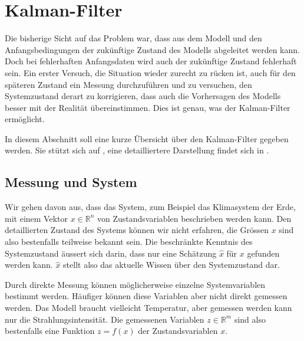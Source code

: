 %
%
%
\section{Kalman-Filter\label{section:kalman-filter}}
%
Die bisherige Sicht auf das Problem war, dass aus dem Modell und den
Anfangsbedingungen der zukünftige Zustand des Modells abgeleitet werden
kann.
Doch bei fehlerhaften Anfangsdaten wird auch der zukünftige Zustand
fehlerhaft sein.
Ein erster Versuch, die Situation wieder zurecht zu rücken ist, auch für
den späteren Zustand ein Messung durchzuführen und zu versuchen,
den Systemzustand derart zu korrigieren, dass auch die Vorhersagen des
Modells besser mit der Realität übereinstimmen.
Dies ist genau, was der Kalman-Filter ermöglicht.

In diesem Abschnitt soll eine kurze Übersicht über den Kalman-Filter
gegeben werden.
Sie stützt sich auf \cite{skript:catlin}, eine detailliertere Darstellung
findet sich in \cite[Kapitel 8]{skript:wrstatskript}.

\subsection{Messung und System\label{subsection:messung und system}}
Wir gehen davon aus, dass das System, zum Beispiel das Klimasystem der Erde,
mit einem Vektor $x\in\mathbb R^n$ von Zustandsvariablen beschrieben werden
kann.
Den detaillierten Zustand des Systems können wir nicht erfahren, die
Grössen $x$ sind also bestenfalls teilweise bekannt sein.
Die beschränkte Kenntnis des Systemzustand äussert sich darin, dass
nur eine Schätzung $\hat x$ für $x$ gefunden werden kann.
$\hat x$ stellt also das aktuelle Wissen über den Systemzustand dar.

Durch direkte Messung können möglicherweise einzelne Systemvariablen
bestimmt werden.
Häufiger können diese Variablen aber nicht direkt gemessen werden.
Das Modell braucht vielleicht Temperatur, aber gemessen werden kann nur
die Strahlungsintensität.
Die gemessenen Variablen $z\in\mathbb R^m$ sind also bestenfalls eine
Funktion $z=f(x)$ der Zustandsvariablen $x$.

